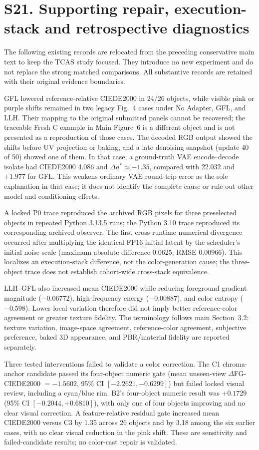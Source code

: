 \documentclass[11pt]{article}
\begin{document}
\clearpage
\section*{S21. Supporting repair, execution-stack and retrospective diagnostics}
The following existing records are relocated from the preceding conservative main text to keep the TCAS study focused. They introduce no new experiment and do not replace the strong matched comparisons. All substantive records are retained with their original evidence boundaries.

GFL lowered reference-relative CIEDE2000 in 24/26 objects, while visible pink or purple shifts remained in two legacy Fig.~4 cases under No Adapter, GFL, and LLH. Their mapping to the original submitted panels cannot be recovered; the traceable Fresh C example in Main Figure~6 is a different object and is not presented as a reproduction of those cases. The decoded RGB output showed the shifts before UV projection or baking, and a late denoising snapshot (update 40 of 50) showed one of them. In that case, a ground-truth VAE encode--decode isolate had CIEDE2000 4.086 and $\Delta a^*\approx-1.35$, compared with 22.032 and $+1.977$ for GFL. This weakens ordinary VAE round-trip error as the sole explanation in that case; it does not identify the complete cause or rule out other model and conditioning effects.

A locked P0 trace reproduced the archived RGB pixels for three preselected objects in repeated Python 3.13.5 runs; the Python 3.10 trace reproduced its corresponding archived observer. The first cross-runtime numerical divergence occurred after multiplying the identical FP16 initial latent by the scheduler's initial noise scale (maximum absolute difference 0.0625; RMSE 0.00966). This localizes an execution-stack difference, not the color-generation cause; the three-object trace does not establish cohort-wide cross-stack equivalence.

LLH--GFL also increased mean CIEDE2000 while reducing foreground gradient magnitude ($-0.06772$), high-frequency energy ($-0.00887$), and color entropy ($-0.598$). Lower local variation therefore did not imply better reference-color agreement or greater texture fidelity. The terminology follows main Section~3.2: texture variation, image-space agreement, reference-color agreement, subjective preference, baked 3D appearance, and PBR/material fidelity are reported separately.

Three tested interventions failed to validate a color correction. The C1 chroma-anchor candidate passed its four-object numeric gate (mean unseen-view $\Delta$FG-CIEDE2000 $=-1.5602$, 95\% CI $[-2.2621,-0.6299]$) but failed locked visual review, including a cyan/blue rim. B2's four-object numeric result was $+0.1729$ (95\% CI $[-0.2044,+0.6810]$), with only one of four objects improving and no clear visual correction. A feature-relative residual gate increased mean CIEDE2000 versus C3 by 1.35 across 26 objects and by 3.18 among the six earlier cases, with no clear visual reduction in the pink shift. These are sensitivity and failed-candidate results; no color-cast repair is validated.
\end{document}
